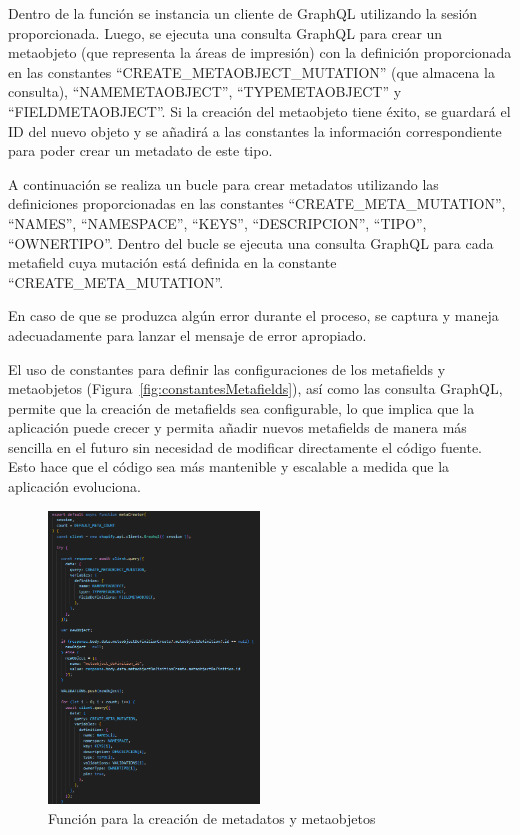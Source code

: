 \documentclass[12pt]{article}
\begin{document}
Dentro de la función se instancia un cliente de GraphQL utilizando la sesión proporcionada. Luego, se ejecuta una consulta GraphQL para crear
un metaobjeto (que representa la áreas de impresión) con la definición proporcionada en las constantes ``CREATE\_METAOBJECT\_MUTATION'' (que almacena la consulta), ``NAMEMETAOBJECT'', 
``TYPEMETAOBJECT'' y ``FIELDMETAOBJECT''. Si la creación del metaobjeto tiene éxito, se guardará el ID del nuevo objeto y se añadirá a las constantes 
la información correspondiente para poder crear un metadato de este tipo.

A continuación se realiza un bucle para crear metadatos utilizando las definiciones proporcionadas en las constantes ``CREATE\_META\_MUTATION'', ``NAMES'',
``NAMESPACE'', ``KEYS'', ``DESCRIPCION'', ``TIPO'', ``OWNERTIPO''. Dentro del bucle se ejecuta una consulta GraphQL para cada metafield cuya mutación
está definida en la constante  ``CREATE\_META\_MUTATION''.

En caso de que se produzca algún error durante el proceso, se captura y maneja adecuadamente para lanzar el mensaje de error apropiado.

El uso de constantes para definir las configuraciones de los metafields y metaobjetos (Figura~\ref{fig:constantesMetafields}), así como las consulta GraphQL, permite que la creación
de metafields sea configurable, lo que implica que la aplicación puede crecer y permita añadir nuevos metafields de manera más sencilla en el futuro 
sin necesidad de modificar directamente el código fuente. Esto hace que el código sea más mantenible y escalable a medida que la 
aplicación evoluciona.


\begin{figure}[ht]
    \centering
    \includegraphics[width=0.5\textwidth]{imagenes-back/funcionmetaCreator.png}
    \caption{\label{fig:funcionMetafields} Función para la creación de metadatos y metaobjetos}
    \vspace{\fill}
\end{figure}
\end{document}
